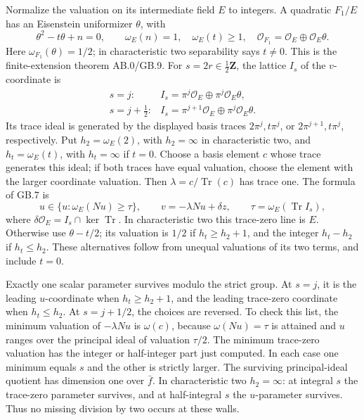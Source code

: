 \documentclass[
  11pt,
]{article}
\begin{document}
Normalize the valuation on its intermediate field \(E\) to integers. A
quadratic \(F_1/E\) has an Eisenstein uniformizer \(\theta\), with \[
 \theta^2-t\theta+n=0,\qquad \omega_E(n)=1,\quad
 \omega_E(t)\geq1,\quad
 \mathcal O_{F_1}=\mathcal O_E\oplus\mathcal O_E\theta .
                                                               \tag{GB21.2}
\] Here \(\omega_{F_1}(\theta)=1/2\); in characteristic two separability
says \(t\ne0\). This is the finite-extension theorem AB.0/GB.9. For
\(s=2r\in\frac12\mathbf Z\), the lattice \(I_s\) of the \(v\)-coordinate
is \[
 \begin{array}{ll}
 s=j:& I_s=\pi^j\mathcal O_E\oplus\pi^j\mathcal O_E\theta,\\
 s=j+\frac12:&
 I_s=\pi^{j+1}\mathcal O_E\oplus\pi^j\mathcal O_E\theta .
 \end{array}
\] Its trace ideal is generated by the displayed basis traces
\(2\pi^j,t\pi^j\), or \(2\pi^{j+1},t\pi^j\), respectively. Put
\(h_2=\omega_E(2)\), with \(h_2=\infty\) in characteristic two, and
\(h_t=\omega_E(t)\), with \(h_t=\infty\) if \(t=0\). Choose a basis
element \(c\) whose trace generates this ideal; if both traces have
equal valuation, choose the element with the larger coordinate
valuation. Then \(\lambda=c/\operatorname{Tr}(c)\) has trace one. The
formula of GB.7 is \[
 u\in\{u:\omega_E(Nu)\geq\tau\},\qquad
 v=-\lambda Nu+\delta z,\qquad
 \tau=\omega_E(\operatorname{Tr}I_s),
                                                               \tag{GB21.3}
\] where \(\delta\mathcal O_E=I_s\cap\ker\operatorname{Tr}\). In
characteristic two this trace-zero line is \(E\). Otherwise use
\(\theta-t/2\); its valuation is \(1/2\) if \(h_t\geq h_2+1\), and the
integer \(h_t-h_2\) if \(h_t\leq h_2\). These alternatives follow from
unequal valuations of its two terms, and include \(t=0\).

Exactly one scalar parameter survives modulo the strict group. At
\(s=j\), it is the leading \(u\)-coordinate when \(h_t\geq h_2+1\), and
the leading trace-zero coordinate when \(h_t\leq h_2\). At \(s=j+1/2\),
the choices are reversed. To check this list, the minimum valuation of
\(-\lambda Nu\) is \(\omega(c)\), because \(\omega(Nu)=\tau\) is
attained and \(u\) ranges over the principal ideal of valuation
\(\tau/2\). The minimum trace-zero valuation has the integer or
half-integer part just computed. In each case one minimum equals \(s\)
and the other is strictly larger. The surviving principal-ideal quotient
has dimension one over \(\bar f\). In characteristic two \(h_2=\infty\):
at integral \(s\) the trace-zero parameter survives, and at
half-integral \(s\) the \(u\)-parameter survives. Thus no missing
division by two occurs at these walls.
\end{document}
